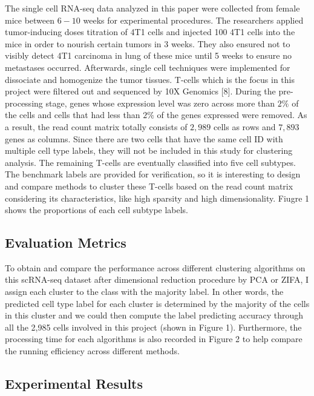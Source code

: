 \documentclass[12pt]{article}
\theoremstyle{definition}
\begin{document}
The single cell RNA-seq data analyzed in this paper were collected from female mice between $6-10$ weeks for experimental procedures. The researchers applied tumor-inducing doses titration of 4T1 cells and injected 100 4T1 cells into the mice in order to nourish certain tumors in 3
weeks. They also ensured not to visibly detect 4T1 carcinoma in lung of these mice until 5 weeks to ensure no metastases occurred. Afterwards, single cell techniques were implemented for dissociate and homogenize the tumor tissues. T-cells which is the focus in this project were filtered out and sequenced by 10X Genomics [8]. During the pre-processing stage, genes whose expression level was zero across more than $2\%$ of the cells and cells that had less than $2\%$ of the genes expressed were removed. As a result, the read count matrix totally consists of $2,989$ cells as rows and $7,893$ genes as columns. Since there are two cells that have the same cell ID with multiple cell type labels, they will not be included in this study for clustering analysis. The remaining T-cells are eventually classified into five cell subtypes. The benchmark labels are provided for verification, so it is interesting to design and compare methods to cluster these T-cells based on the read count matrix considering its characteristics, like high sparsity and high dimensionality. Fiugre 1 shows the proportions of each cell subtype labels.

\subsection{Evaluation Metrics}
To obtain and compare the performance across different clustering algorithms on this scRNA-seq dataset after dimensional reduction procedure by PCA or ZIFA, I assign each cluster to the class with the majority label. In other words, the predicted cell type label for each cluster is determined by the majority of the cells in this cluster and we could then compute the label predicting accuracy through all the 2,985 cells involved in this project (shown in Figure 1). Furthermore, the processing time for each algorithms is also recorded in Figure 2 to help compare the running efficiency across different methods.

\subsection{Experimental Results}
\end{document}
